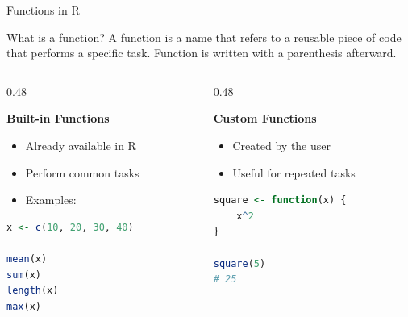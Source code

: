 \documentclass[aspectratio=169,11pt]{beamer}
\begin{document}
	
	\begin{frame}[fragile]{Functions in R}
		
		\begin{block}{What is a function?}
		A function is a name that refers to a reusable piece of code that performs a specific task. Function is written with a parenthesis afterward.
		\end{block}
		
		\vspace{0.3cm}
		
		\begin{columns}[T]
			
			\begin{column}{0.48\textwidth}
				
				\textbf{\large Built-in Functions}
				
				\begin{itemize}
					\item Already available in R
					\item Perform common tasks
					\item Examples:
				\end{itemize}
				
				
				\begin{lstlisting}[language=R]
x <- c(10, 20, 30, 40)

mean(x)
sum(x)
length(x)
max(x)
				\end{lstlisting}
			
				
			\end{column}
			
			\begin{column}{0.48\textwidth}
				
				\textbf{\large Custom Functions}
				
				\begin{itemize}
					\item Created by the user
					\item Useful for repeated tasks
				\end{itemize}
				
				\begin{lstlisting}[language=R]
square <- function(x) {
	x^2
}

square(5)
# 25
				\end{lstlisting}
				
			\end{column}
			
		\end{columns}
		
	\end{frame}
	
\end{document}
